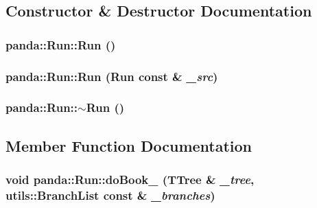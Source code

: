 \subsection{Constructor \& Destructor Documentation}
\hypertarget{classpanda_1_1Run_a7b1be463c73f157e7c0eb8520666467b}{
\subsubsection[{Run}]{\setlength{\rightskip}{0pt plus 5cm}panda::Run::Run ()}}
\label{classpanda_1_1Run_a7b1be463c73f157e7c0eb8520666467b}
\hypertarget{classpanda_1_1Run_a827427116d35b287c0264f08ab7ed84b}{
\subsubsection[{Run}]{\setlength{\rightskip}{0pt plus 5cm}panda::Run::Run ({\bf Run} const \& {\em \_\-src})}}
\label{classpanda_1_1Run_a827427116d35b287c0264f08ab7ed84b}
\hypertarget{classpanda_1_1Run_a831dc947243fba5f4f7801b32d91e1ce}{
\subsubsection[{$\sim$Run}]{\setlength{\rightskip}{0pt plus 5cm}panda::Run::$\sim$Run ()}}
\label{classpanda_1_1Run_a831dc947243fba5f4f7801b32d91e1ce}


\subsection{Member Function Documentation}
\hypertarget{classpanda_1_1Run_a7f6f2652e76aa39c2e584ce97d1245d3}{
\subsubsection[{doBook\_\-}]{\setlength{\rightskip}{0pt plus 5cm}void panda::Run::doBook\_\- (TTree \& {\em \_\-tree}, \/  {\bf utils::BranchList} const \& {\em \_\-branches})}}
\label{classpanda_1_1Run_a7f6f2652e76aa39c2e584ce97d1245d3}


